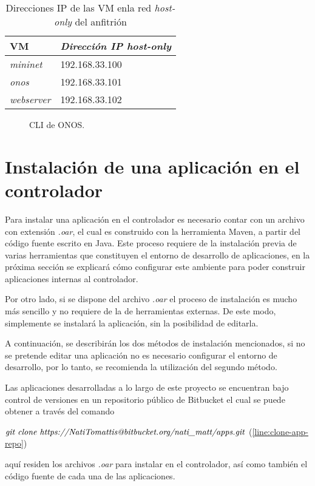 \begin{table}[th]
    \centering
    \caption{Direcciones IP de las VM enla red \textit{host-only} del anfitrión}
    \label{t-ipvm}
    \begin{tabular}{|l|l|}
    \hline
    \rowcolor[HTML]{C0C0C0} 
    \textbf{VM}        & \textit{\textbf{Dirección IP host-only}} \\ \hline \hline
    \textit{mininet}   & 192.168.33.100                           \\ \hline
    \rowcolor[HTML]{C0C0C0} 
    \textit{onos}      & 192.168.33.101                           \\ \hline
    \textit{webserver} & 192.168.33.102                           \\ \hline
    \end{tabular}
    \end{table}

\begin{figure}[th]
	\centering 
	\caption[CLI de ONOS]{CLI de ONOS.}
	\label{fig:onoscli}
\end{figure}

\section{Instalación de una aplicación en el controlador}
Para instalar una aplicación en el controlador es necesario contar con un archivo con extensión \textit{.oar}, el cual es construido con la herramienta Maven, a partir del código fuente escrito en Java. Este proceso requiere de la instalación previa de varias herramientas que constituyen el entorno de desarrollo de aplicaciones, en la próxima sección se explicará cómo configurar este ambiente para poder construir aplicaciones internas al controlador. 

Por otro lado, si se dispone del archivo \textit{.oar} el proceso de instalación es mucho más sencillo y no requiere de la de herramientas externas. De este modo, simplemente se instalará la aplicación, sin la posibilidad de editarla.

A continuación, se describirán los dos métodos de instalación mencionados, si no se pretende editar una aplicación no es necesario configurar el entorno de desarrollo, por lo tanto, se recomienda la utilización del segundo método. 


Las aplicaciones desarrolladas a lo largo de este proyecto se encuentran bajo control de versiones en un repositorio público de Bitbucket el cual se puede obtener a través del comando
\begin{center}
    \label{line:clone-app-repo}
    $ \emph {git clone https://NatiTomattis@bitbucket.org/nati\_matt/apps.git}$ (\ref{line:clone-app-repo})
\end{center}
aquí residen los archivos \textit{.oar} para instalar en el controlador, así como también el código fuente de cada una de las aplicaciones.

